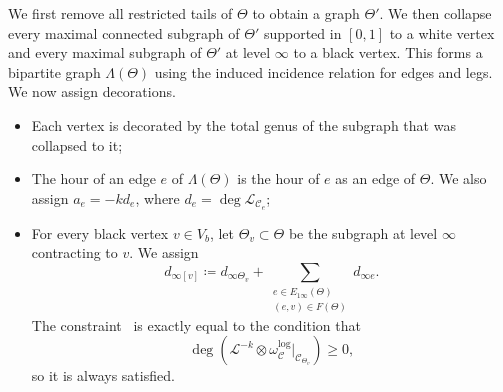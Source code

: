 \documentclass[10pt]{amsart}
\theoremstyle{definition}
\theoremstyle{remark}
\theoremstyle{plain}
\theoremstyle{definition}
\theoremstyle{remark}
\newcommand{\msc}[1]{\mathscr{#1}}
\newcommand{\1}{\mathbf{1}}
\newcommand{\2}{\mathbf{2}}
\newcommand{\3}{\mathbf{3}}
\numberwithin{equation}{section}
\begin{document}
We first remove all restricted tails of $\Theta$ to obtain a graph $\Theta'$. We then collapse every maximal connected subgraph of $\Theta'$ supported in $[0,1]$ to a white vertex and every maximal subgraph of $\Theta'$ at level $\infty$ to a black vertex. This forms a bipartite graph $\Lambda(\Theta)$ using the induced incidence relation for edges and legs. We now assign decorations.
\begin{itemize}
    \item Each vertex is decorated by the total genus of the subgraph that was collapsed to it;
    \item The hour of an edge $e$ of $\Lambda(\Theta)$ is the hour of $e$ as an edge of $\Theta$. We also assign $a_e = -k d_e$, where $d_e = \deg \msc{L}_{\msc{C}_e}$;
    \item For every black vertex $v \in V_b$, let $\Theta_v \subset \Theta$ be the subgraph at level $\infty$ contracting to $v$. We assign
        \[ d_{\infty[v]} \coloneqq d_{\infty \Theta_v} + \sum_{\substack{e \in E_{1\infty}(\Theta) \\ (e,v) \in F(\Theta)}} d_{\infty e}. \]
        The constraint~ is exactly equal to the condition that 
        \[\deg(\msc{L}^{-k} \otimes \omega_{\msc{C}}^{\log}|_{\msc{C}_{\Theta_v}}) \geq 0,\] 
        so it is always satisfied.
\end{itemize}
\end{document}
